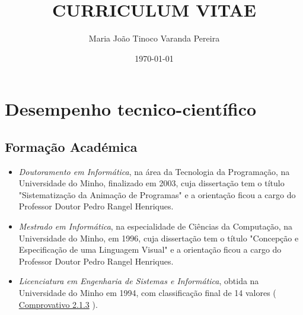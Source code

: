 \documentclass[11pt]{article}
\title{CURRICULUM VITAE \\

\vspace{3cm}
\vspace{3cm}}
\author{Maria João Tinoco Varanda Pereira}
\date{
\today}
\begin{document}
\maketitle
\newpage
\section{Desempenho tecnico-científico}
\subsection{Formação Académica}
\begin{itemize}
\item{
\em Doutoramento em Informática}, na área da Tecnologia da Programação, na Universidade do Minho, finalizado em 2003, cuja dissertação tem o título "Sistematização da Animação de Programas" e a orientação ficou a cargo do Professor Doutor Pedro Rangel Henriques.
\item{
\em Mestrado em Informática}, na especialidade de Ciências da Computação, na Universidade do Minho, em 1996, cuja dissertação tem o título "Concepção e Especificação de uma Linguagem Visual" e a orientação ficou a cargo do Professor Doutor Pedro Rangel Henriques.
\item{
\em Licenciatura em Engenharia de Sistemas e Informática}, obtida na Universidade do Minho em 1994, com classificação final de 14 valores ( 
\href{run:Diplomas/licenc.pdf}{Comprovativo 2.1.3} ).
\end{itemize}
\end{document}
